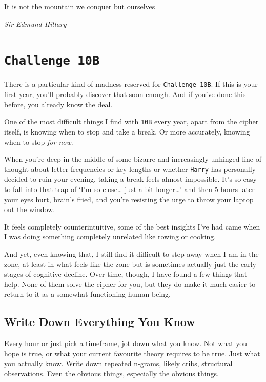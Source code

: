 
\epigraph{It is not the mountain we conquer but ourselves }
{\textit{Sir Edmund Hillary}}

\section{\texttt{Challenge 10B}}

There is a particular kind of madness reserved for \texttt{Challenge 10B}. If this is your first year, you’ll probably discover that soon enough. And if you've done this before, you already know the deal. 

One of the most difficult things I find with \texttt{10B} every year, apart from the cipher itself, is knowing when to stop and take a break. Or more accurately, knowing when to stop \textit{for now}.

When you're deep in the middle of some bizarre and increasingly unhinged line of thought about letter frequencies or key lengths or whether \texttt{Harry} has personally decided to ruin your evening, taking a break feels almost impossible. It’s so easy to fall into that trap of `I’m so close… just a bit longer…' and then 5 hours later your eyes hurt, brain’s fried, and you’re resisting the urge to throw your laptop out the window. 

It feels completely counterintuitive, some of the best insights I’ve had came when I was doing something completely unrelated like rowing or cooking. 
 
And yet, even knowing that, I still find it difficult to step away when I am in the zone, at least in what feels like the zone but is sometimes actually just the early stages of cognitive decline. Over time, though, I have found a few things that help. None of them solve the cipher for you, but they do make it much easier to return to it as a somewhat functioning human being. 

\subsection{Write Down Everything You Know}
Every hour or just pick a timeframe, jot down what you know. Not what you hope is true, or what your current favourite theory requires to be true. Just what you actually know. Write down repeated n-grams, likely cribs, structural observations. Even the obvious things, especially the obvious things. 

